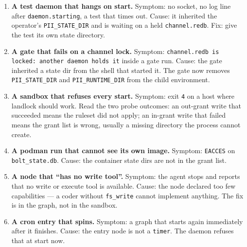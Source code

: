 \begin{enumerate}
	\item \textbf{A test daemon that hangs on start.} Symptom: no socket, no log line after
	\texttt{daemon.starting}, a test that times out. Cause: it inherited the operator's
	\texttt{PII\_STATE\_DIR} and is waiting on a held \texttt{channel.redb}. Fix: give the test
	its own state directory.
	\item \textbf{A gate that fails on a channel lock.} Symptom: \texttt{channel.redb is
	locked: another daemon holds it} inside a gate run. Cause: the gate inherited a state dir
	from the shell that started it. The gate now removes \texttt{PII\_STATE\_DIR} and
	\texttt{PII\_RUNTIME\_DIR} from the child environment.
	\item \textbf{A sandbox that refuses every start.} Symptom: exit \texttt{4} on a host where
	landlock should work. Read the two probe outcomes: an out-grant write that succeeded means
	the ruleset did not apply; an in-grant write that failed means the grant list is wrong,
	usually a missing directory the process cannot create.
	\item \textbf{A podman run that cannot see its own image.} Symptom: \texttt{EACCES} on
	\texttt{bolt\_state.db}. Cause: the container state dirs are not in the grant list.
	\item \textbf{A node that ``has no write tool''.} Symptom: the agent stops and reports that
	no write or execute tool is available. Cause: the node declared too few capabilities --- a
	coder without \texttt{fs\_write} cannot implement anything. The fix is in the graph, not in
	the sandbox.
	\item \textbf{A cron entry that spins.} Symptom: a graph that starts again immediately
	after it finishes. Cause: the entry node is not a \texttt{timer}. The daemon refuses that
	at start now.
\end{enumerate}
